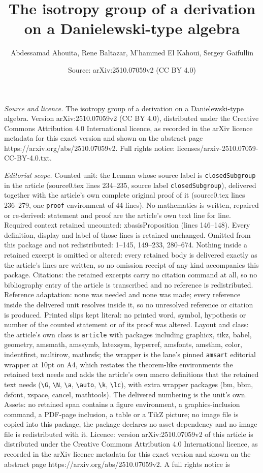 \documentclass[10pt,a4paper]{amsart}
\title[The isotropy group of a derivation on a Danielewski-type alg]{The isotropy group of a derivation on a Danielewski-type algebra}
\author{Abdessamad Ahouita, Rene Baltazar, M'hammed El Kahoui, Sergey Gaifullin}
\date{Source: arXiv:2510.07059v2 (CC BY 4.0)}
\begin{document}
\maketitle

\noindent\emph{Source and licence.} The isotropy group of a derivation on a Danielewski-type algebra. Version arXiv:2510.07059v2 (CC BY 4.0), distributed under the Creative Commons Attribution 4.0 International licence, as recorded in the arXiv licence metadata for this exact version and shown on the abstract page https://arxiv.org/abs/2510.07059v2. Full rights notice: licenses/arxiv-2510.07059-CC-BY-4.0.txt.\par\smallskip

\noindent\textit{Editorial scope.} Counted unit: the Lemma whose source label is \texttt{closedSubgroup} in the article (source0.tex lines 234--235, source label \texttt{closedSubgroup}), delivered together with the article's own complete original proof of it (source0.tex lines 236--279, one \texttt{proof} environment of 44 lines). No mathematics is written, repaired or re-derived: statement and proof are the article's own text line for line. Required context retained uncounted: xbasisProposition (lines 146--148). Every definition, display and label of those lines is retained unchanged. Omitted from this package and not redistributed: 1--145, 149--233, 280--674. Nothing inside a retained excerpt is omitted or altered: every retained body is delivered exactly as the article's lines are written, so no omission receipt of any kind accompanies this package. Citations: the retained excerpts carry no citation command at all, so no bibliography entry of the article is transcribed and no reference is redistributed. Reference adaptation: none was needed and none was made; every reference inside the delivered unit resolves inside it, so no unresolved reference or citation is produced. Printed slips kept literal: no printed word, symbol, hypothesis or number of the counted statement or of its proof was altered. Layout and class: the article's own class is \texttt{article} with packages including graphicx, tikz, babel, geometry, amsmath, amssymb, latexsym, hyperref, amsfonts, amsthm, color, indentfirst, multirow, mathrsfs; the wrapper is the lane's pinned \texttt{amsart} editorial wrapper at 10pt on A4, which restates the theorem-like environments the retained text needs and adds the article's own macro definitions that the retained text needs (\texttt{\textbackslash G}, \texttt{\textbackslash N}, \texttt{\textbackslash a}, \texttt{\textbackslash auto}, \texttt{\textbackslash k}, \texttt{\textbackslash lc}), with extra wrapper packages (bm, bbm, dsfont, xspace, cancel, mathtools). The delivered numbering is the unit's own. Assets: no retained span contains a figure environment, a graphics-inclusion command, a PDF-page inclusion, a table or a TikZ picture; no image file is copied into this package, the package declares no asset dependency and no image file is redistributed with it. Licence: version arXiv:2510.07059v2 of this article is distributed under the Creative Commons Attribution 4.0 International licence, as recorded in the arXiv licence metadata for this exact version and shown on the abstract page https://arxiv.org/abs/2510.07059v2. A full rights notice is 
\end{document}
